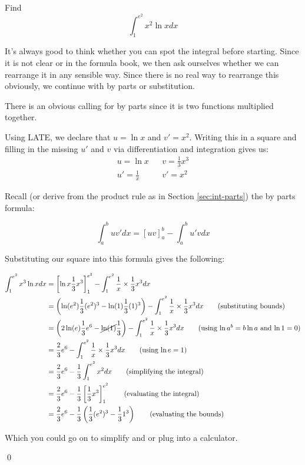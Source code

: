 \begin{example}
    Find 
    \[ \int_1^{e^2} x^2 \ln x dx\]
\end{example}
\begin{solution}
    It's always good to think whether you can spot the integral before starting. Since it is not clear or in the formula book, we then ask ourselves whether we can rearrange it in any sensible way.
    Since there is no real way to rearrange this obviously, we continue with by parts or substitution.

    There is an obvious calling for by parts since it is two functions multiplied together.

    Using LATE, we declare that $u= \ln x$ and $v' = x^2$. Writing this in a square and filling in the missing $u'$ and $v$ via differentiation and integration gives us:
    \begin{align*}
        u = \ln x & & v = \frac{1}{3}x^3 \\
        u' = \frac{1}{x}& & v' = x^2
    \end{align*}

    Recall (or derive from the product rule as in Section \ref{sec:int-parts}) the by parts formula:

    \[ \int_a^b u v' dx= \left[uv\right]_a^b - \int_a^b u' v dx\]

    Substituting our square into this formula gives the following:

    \begin{align*}
        \int_1^{e^2} x^3 \ln x dx &= \left[\ln x \frac{1}{3}x^3\right]_1^{e^2} - \int_1^{e^2} \frac{1}{x} \times \frac{1}{3}x^3 dx \\
         &=  \left(\ln (e^2) \frac{1}{3}(e^2)^3 - \ln (1) \frac{1}{3}(1)^3\right) - \int_1^{e^2} \frac{1}{x} \times \frac{1}{3}x^3 dx \tag{substituting bounds}\\
         &= \left(2\ln (e) \frac{1}{3}e^6 - \cancel{\ln (1)} \frac{1}{3}\right) - \int_1^{e^2} \frac{1}{x} \times \frac{1}{3}x^3 dx \tag{using $\ln a^b = b\ln a$ and $\ln 1 = 0$}\\
         &= \frac{2}{3}e^6  - \int_1^{e^2} \frac{1}{x} \times \frac{1}{3}x^3 dx \tag{using $\ln e = 1$} \\
         &=  \frac{2}{3}e^6  - \frac{1}{3} \int_1^{e^2} x^2 dx \tag{simplifying the integral} \\ 
         &= \frac{2}{3}e^6  - \frac{1}{3} \left[\frac{1}{3} x^3\right]_1^{e^2}  \tag{evaluating the integral} \\
         &= \frac{2}{3}e^6  - \frac{1}{3} \left(\frac{1}{3} (e^2)^3 - \frac{1}{3} 1^3\right) \tag{evaluating the bounds}   
    \end{align*}

    Which you could go on to simplify and or plug into a calculator.

    \qed
\end{solution}



